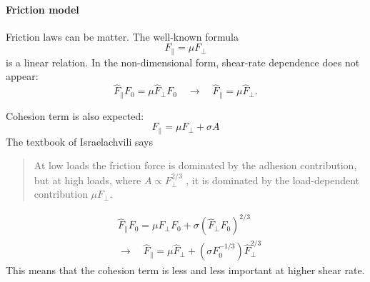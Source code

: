 \documentclass{article}
\begin{document}
\paragraph{Friction model}

Friction laws can be matter.
%
The well-known formula
\begin{equation}
 F_{\|} = \mu F_{\perp}
\end{equation}
is a linear relation.
%
In the non-dimensional form,
shear-rate dependence does not appear:
\begin{equation}
 \hat{F}_{\|} F_0 = \mu \hat{F}_{\perp} F_0
\quad
\rightarrow 
\quad
 \hat{F}_{\|} = \mu \hat{F}_{\perp}.
\end{equation}
%


Cohesion term is also expected:
\begin{equation}
 F_{\parallel} = \mu F_{\perp}
 + \sigma A
\end{equation}
The textbook of Israelachvili says
\begin{quote}
At low loads
the friction force is dominated
by the adhesion contribution,
but at high loads,
where $A \propto F_{\perp}^{2/3}$ ,
it is dominated by the load-dependent contribution 
$\mu F_{\perp}$.
\end{quote}
%
\begin{align}
& 
\hat{F}_{\parallel} F_0
= \mu \hat{F}_{\perp} F_0 +
\sigma (\hat{F}_{\perp} F_0)^{2/3} \\
&
\to \quad
\hat{F}_{\parallel} 
= \mu \hat{F}_{\perp}  +
(\sigma F_0^{-1/3}) \hat{F}_{\perp}^{2/3}  
\end{align}
%
This means that
the cohesion term is less and less important
at higher shear rate.







\end{document}
